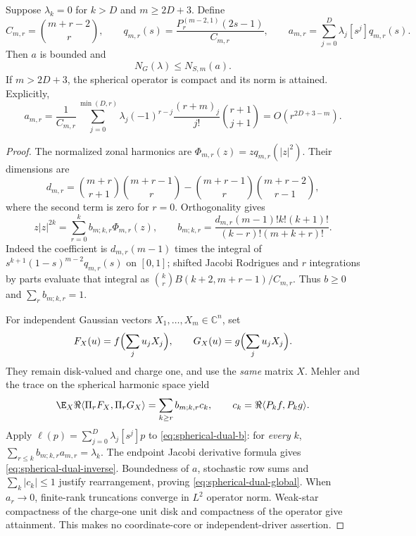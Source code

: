 \begin{theorem}
\label{thm:spherical-dual-transfer}
Suppose $\lambda_k=0$ for $k>D$ and $m\ge2D+3$. Define
\[
 C_{m,r}=\binom{m+r-2}{r},\qquad
 q_{m,r}(s)=\frac{P_r^{(m-2,1)}(2s-1)}{C_{m,r}},\qquad
 a_{m,r}=\sum_{j=0}^D\lambda_j[s^j]q_{m,r}(s).
\]
Then $a$ is bounded and
\begin{equation}\label{eq:spherical-dual-global}
 \boxed{N_G(\lambda)\le N_{S,m}(a).}
\end{equation}
If $m>2D+3$, the spherical operator is compact and its norm is attained.
Explicitly,
\begin{equation}\label{eq:spherical-dual-inverse}
 a_{m,r}=\frac1{C_{m,r}}\sum_{j=0}^{\min(D,r)}
 \lambda_j(-1)^{r-j}\frac{(r+m)_j}{j!}\binom{r+1}{j+1}
 =O(r^{2D+3-m}).
\end{equation}
\end{theorem}
\begin{proof}
The normalized zonal harmonics are $\Phi_{m,r}(z)=zq_{m,r}(|z|^2)$.
Their dimensions are
\[
 d_{m,r}=\binom{m+r}{r+1}\binom{m+r-1}{r}
          -\binom{m+r-1}{r}\binom{m+r-2}{r-1},
\]
where the second term is zero for $r=0$. Orthogonality gives
\begin{equation}\label{eq:spherical-dual-b}
 z|z|^{2k}=\sum_{r=0}^k b_{m;k,r}\Phi_{m,r}(z),\qquad
 b_{m;k,r}=\frac{d_{m,r}(m-1)!k!(k+1)!}{(k-r)!(m+k+r)!}.
\end{equation}
Indeed the coefficient is $d_{m,r}(m-1)$ times the integral of
$s^{k+1}(1-s)^{m-2}q_{m,r}(s)$ on $[0,1]$; shifted Jacobi Rodrigues
and $r$ integrations by parts evaluate that integral as
$\binom{k}{r}B(k+2,m+r-1)/C_{m,r}$. Thus $b\ge0$ and
$\sum_r b_{m;k,r}=1$.

For independent Gaussian vectors $X_1,\ldots,X_m\in\mathbb C^n$, set
\[
 F_X(u)=f\Bigl(\sum_j u_jX_j\Bigr),\qquad
 G_X(u)=g\Bigl(\sum_j u_jX_j\Bigr).
\]
They remain disk-valued and charge one, and use the \emph{same} matrix
$X$. Mehler and the trace on the spherical harmonic space yield
\[
 \E_X\Re\langle\Pi_rF_X,\Pi_rG_X\rangle
 =\sum_{k\ge r}b_{m;k,r}c_k,\qquad
 c_k=\Re\langle P_kf,P_kg\rangle.
\]
Apply $\ell(p)=\sum_{j=0}^D\lambda_j[s^j]p$ to
\eqref{eq:spherical-dual-b}: for \emph{every} $k$,
$\sum_{r\le k}b_{m;k,r}a_{m,r}=\lambda_k$.
The endpoint Jacobi derivative formula gives
\eqref{eq:spherical-dual-inverse}. Boundedness of $a$, stochastic
row sums and $\sum_k|c_k|\le1$ justify rearrangement, proving
\eqref{eq:spherical-dual-global}. When $a_r\to0$, finite-rank
truncations converge in $L^2$ operator norm. Weak-star compactness of
the charge-one unit disk and compactness of the operator give attainment.
This makes no coordinate-core or independent-driver assertion.
\end{proof}

